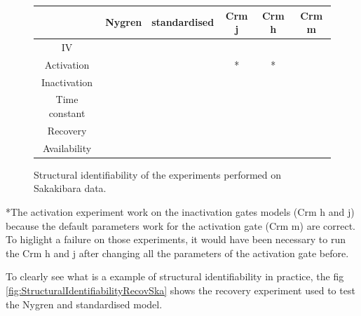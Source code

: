 \documentclass[11pt]{report}
\newcommand{\cmark}{ \color{green} \ding{51}}%
\newcommand{\xmark}{ \color{red} \ding{55}}%
\begin{document}
\begin{figure}[H]
\centering
\captionsetup{singlelinecheck = false, format= hang, justification=centerlast, labelsep=space}
\begin{measuredfigure}
\begin{tabular}{|c|c|c|c|c|c|}
\hline
& Nygren & standardised & Crm j & Crm h & Crm m\\
\hline
IV & \cmark   &  \cmark & \cmark & \cmark & \cmark  \\
\hline
Activation &  \cmark  &   \cmark & \cmark * & \cmark * &   \cmark \\
\hline
Inactivation &  \cmark &  \cmark &  \cmark & \cmark &   \xmark \\
\hline
Time constant &  \cmark &  \cmark & \xmark & \xmark & \xmark   \\
\hline
Recovery & \xmark &  \cmark & \cmark  & \xmark &  \xmark  \\
\hline
Availability & \xmark &  \cmark & \xmark & \xmark & \xmark  \\
\hline
\end{tabular}
\caption{Structural identifiability of the experiments performed on Sakakibara data.
 \cite{Sakakibara1992}}
\end{measuredfigure}
\addtocounter{figure}{-1}
\label{tab:StructuralIdentifiabilitySaka}
\end{figure}

*The activation experiment work on the inactivation gates models (Crm h and j) because the default parameters work for the activation gate (Crm m) are correct. To higlight a failure on those experiments, it would have been necessary to run the Crm h and j after changing all the parameters of the activation gate before.

To clearly see what is a example of structural identifiability in practice, the fig \ref{fig:StructuralIdentifiabilityRecovSka} shows the recovery experiment used to test the Nygren \cite{Nygren1998} and standardised model. 
\end{document}

